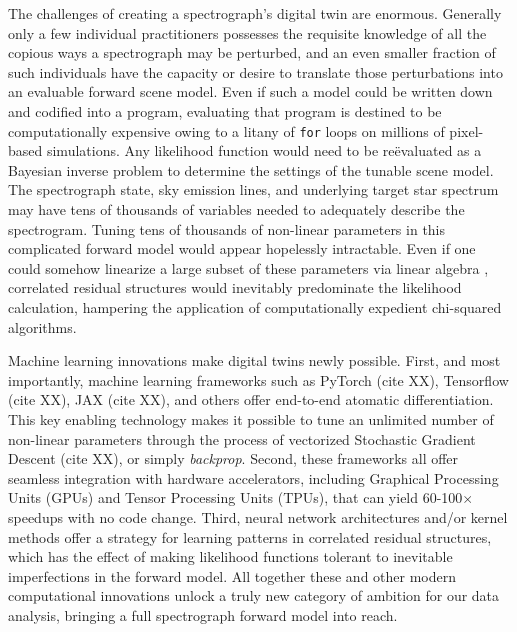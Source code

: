 \documentclass[twocolumn]{aastex63}
\begin{document}
The challenges of creating a spectrograph's digital twin are enormous.  Generally only a few individual practitioners possesses the requisite knowledge of all the copious ways a spectrograph may be perturbed, and an even smaller fraction of such individuals have the capacity or desire to translate those perturbations into an evaluable forward scene model.  Even if such a model could be written down and codified into a program, evaluating that program is destined to be computationally expensive owing to a litany of \texttt{for} loops on millions of pixel-based simulations.  Any likelihood function would need to be re\"evaluated as a Bayesian inverse problem to determine the settings of the tunable scene model.  The spectrograph state, sky emission lines, and underlying target star spectrum may have tens of thousands of variables needed to adequately describe the spectrogram.  Tuning tens of thousands of non-linear parameters in this complicated forward model would appear hopelessly intractable.  Even if one could somehow linearize a large subset of these parameters via linear algebra \citep{2010PASP..122..248B}, correlated residual structures would inevitably predominate the likelihood calculation, hampering the application of computationally expedient chi-squared algorithms.

Machine learning innovations make digital twins newly possible. First, and most importantly, machine learning frameworks such as PyTorch (cite XX), Tensorflow (cite XX), JAX (cite XX), and others offer end-to-end atomatic differentiation.  This key enabling technology makes it possible to tune an unlimited number of non-linear parameters through the process of vectorized Stochastic Gradient Descent (cite XX), or simply \emph{backprop}.  Second, these frameworks all offer seamless integration with hardware accelerators, including Graphical Processing Units (GPUs) and Tensor Processing Units (TPUs), that can yield 60-100$\times$ speedups with no code change.  Third, neural network architectures and/or kernel methods offer a strategy for learning patterns in correlated residual structures, which has the effect of making likelihood functions tolerant to inevitable imperfections in the forward model.  All together these and other modern computational innovations unlock a truly new category of ambition for our data analysis, bringing a full spectrograph forward model into reach.
\end{document}
